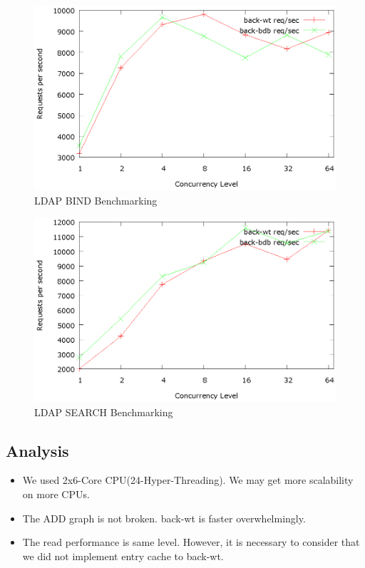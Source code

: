 \documentclass[a4paper
,twocolumn
]{article}
\begin{document}
\begin{figure}[H]
\centering
\includegraphics[width=0.9\columnwidth]{benchmark/bind.eps}
\caption{LDAP BIND Benchmarking}
\end{figure}

\begin{figure}[H]
\centering
\includegraphics[width=0.9\columnwidth]{benchmark/search.eps}
\caption{LDAP SEARCH Benchmarking}
\end{figure}

\subsection{Analysis}\label{analysis}

\begin{itemize}
\itemsep1pt\parskip0pt
\item
  We used 2x6-Core CPU(24-Hyper-Threading). We may get more scalability
  on more CPUs.
\item
  The ADD graph is not broken. back-wt is faster overwhelmingly.
\item
  The read performance is same level. However, it is necessary to
  consider that we did not implement entry cache to back-wt.
\end{itemize}
\end{document}
